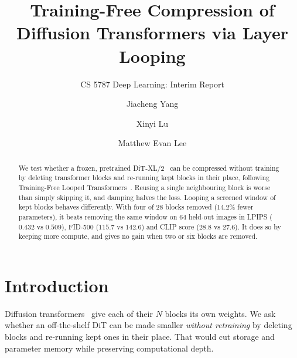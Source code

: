\documentclass[sigconf,nonacm]{acmart}
\begin{document}
\title{Training-Free Compression of Diffusion Transformers via Layer Looping}
\subtitle{CS 5787 Deep Learning: Interim Report}

\author{Jiacheng Yang}

\author{Xinyi Lu}

\author{Matthew Evan Lee}

\begin{abstract}
We test whether a frozen, pretrained DiT-XL/2~\cite{peebles2023dit} can be compressed
without training by deleting transformer blocks and re-running kept blocks in their
place, following Training-Free Looped Transformers~\cite{chen2026looped}. Reusing a
single neighbouring block is worse than simply skipping it, and damping halves the loss.
Looping a screened window of kept blocks behaves differently. With four of 28 blocks
removed (14.2\% fewer parameters), it beats removing the same window on 64 held-out
images in LPIPS ($0.432$ vs $0.509$), FID-500 ($115.7$ vs $142.6$) and CLIP score
($28.8$ vs $27.6$). It does so by keeping more compute, and gives no gain when two or six
blocks are removed.
\end{abstract}


\maketitle

\section{Introduction}

Diffusion transformers~\cite{peebles2023dit} give each of their $N$ blocks its own
weights. We ask whether an off-the-shelf DiT can be made smaller \emph{without
retraining} by deleting blocks and re-running kept ones in their place. That would cut
storage and parameter memory while preserving computational depth.
\end{document}
